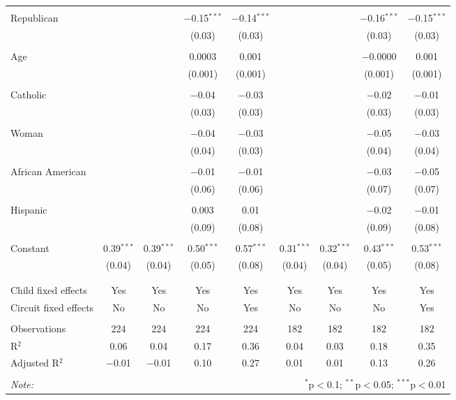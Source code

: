 \begin{table}[h]
\begin{adjustbox}{width=1\textwidth}
\begin{tabular}{@{\extracolsep{5pt}}lcccccccc}
  & & & & & & & & \\ 
 Republican &  &  & $-$0.15$^{***}$ & $-$0.14$^{***}$ &  &  & $-$0.16$^{***}$ & $-$0.15$^{***}$ \\ 
  &  &  & (0.03) & (0.03) &  &  & (0.03) & (0.03) \\ 
  & & & & & & & & \\ 
 Age &  &  & 0.0003 & 0.001 &  &  & $-$0.0000 & 0.001 \\ 
  &  &  & (0.001) & (0.001) &  &  & (0.001) & (0.001) \\ 
  & & & & & & & & \\ 
 Catholic &  &  & $-$0.04 & $-$0.03 &  &  & $-$0.02 & $-$0.01 \\ 
  &  &  & (0.03) & (0.03) &  &  & (0.03) & (0.03) \\ 
  & & & & & & & & \\ 
 Woman &  &  & $-$0.04 & $-$0.03 &  &  & $-$0.05 & $-$0.03 \\ 
  &  &  & (0.04) & (0.03) &  &  & (0.04) & (0.04) \\ 
  & & & & & & & & \\ 
 African American &  &  & $-$0.01 & $-$0.01 &  &  & $-$0.03 & $-$0.05 \\ 
  &  &  & (0.06) & (0.06) &  &  & (0.07) & (0.07) \\ 
  & & & & & & & & \\ 
 Hispanic &  &  & 0.003 & 0.01 &  &  & $-$0.02 & $-$0.01 \\ 
  &  &  & (0.09) & (0.08) &  &  & (0.09) & (0.08) \\ 
  & & & & & & & & \\ 
 Constant & 0.39$^{***}$ & 0.39$^{***}$ & 0.50$^{***}$ & 0.57$^{***}$ & 0.31$^{***}$ & 0.32$^{***}$ & 0.43$^{***}$ & 0.53$^{***}$ \\ 
  & (0.04) & (0.04) & (0.05) & (0.08) & (0.04) & (0.04) & (0.05) & (0.08) \\ 
  & & & & & & & & \\ 
\hline \\[-1.8ex] 
Child fixed effects & Yes & Yes & Yes & Yes & Yes & Yes & Yes & Yes \\ 
Circuit fixed effects & No & No & No & Yes  & No & No & No & Yes \\ 
\hline \\[-1.8ex] 
Observations & 224 & 224 & 224 & 224 & 182 & 182 & 182 & 182 \\ 
R$^{2}$ & 0.06 & 0.04 & 0.17 & 0.36 & 0.04 & 0.03 & 0.18 & 0.35 \\ 
Adjusted R$^{2}$ & $-$0.01 & $-$0.01 & 0.10 & 0.27 & 0.01 & 0.01 & 0.13 & 0.26 \\ 
\hline 
\hline \\[-1.8ex] 
\textit{Note:}  & \multicolumn{8}{r}{$^{*}$p$<$0.1; $^{**}$p$<$0.05; $^{***}$p$<$0.01} \\ 
\end{tabular}\end{adjustbox}
\end{table} 
